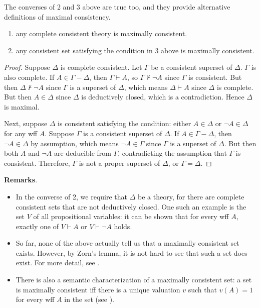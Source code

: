 \documentclass[12pt]{article}
\begin{document}
The converses of 2 and 3 above are true too, and they provide alternative definitions of maximal consistency.
\begin{enumerate}
\item any complete consistent theory is maximally consistent.
\item any consistent set satisfying the condition in 3 above is maximally consistent.
\end{enumerate}
\begin{proof}
Suppose $\Delta$ is complete consistent.  Let $\Gamma$ be a consistent superset of $\Delta$.  $\Gamma$ is also complete.  If $A\in \Gamma-\Delta$, then $\Gamma\vdash A$, so $\Gamma\not\vdash \neg A$ since $\Gamma$ is consistent.  But then $\Delta\not\vdash \neg A$ since $\Gamma$ is a superset of $\Delta$, which means $\Delta\vdash A$ since $\Delta$ is complete.  But then $A\in \Delta$ since $\Delta$ is deductively closed, which is a contradiction.  Hence $\Delta$ is maximal. 

Next, suppose $\Delta$ is consistent satisfying the condition: either $A\in \Delta$ or $\neg A\in \Delta$ for any wff $A$.  Suppose $\Gamma$ is a consistent superset of $\Delta$.  If $A\in \Gamma-\Delta$, then $\neg A\in \Delta$ by assumption, which means $\neg A\in \Gamma$ since $\Gamma$ is a superset of $\Delta$.  But then both $A$ and $\neg A$ are deducible from $\Gamma$, contradicting the assumption that $\Gamma$ is consistent.  Therefore, $\Gamma$ is not a proper superset of $\Delta$, or $\Gamma=\Delta$.
\end{proof}

\textbf{Remarks}.  
\begin{itemize}
\item
In the converse of 2, we require that $\Delta$ be a theory, for there are complete consistent sets that are not deductively closed.  One such an example is the set $V$ of all propositional variables: it can be shown that for every wff $A$, exactly one of $V\vdash A$ or $V\vdash \neg A$ holds.
\item
So far, none of the above actually tell us that a maximally consistent set exists.  However, by Zorn's lemma, it is not hard to see that such a set does exist.  For more detail, see .
\item
There is also a semantic characterization of a maximally consistent set: a set is maximally consistent iff there is a unique valuation $v$ such that $v(A)=1$ for every wff $A$ in the set (see ).
\end{itemize}

\end{document}
